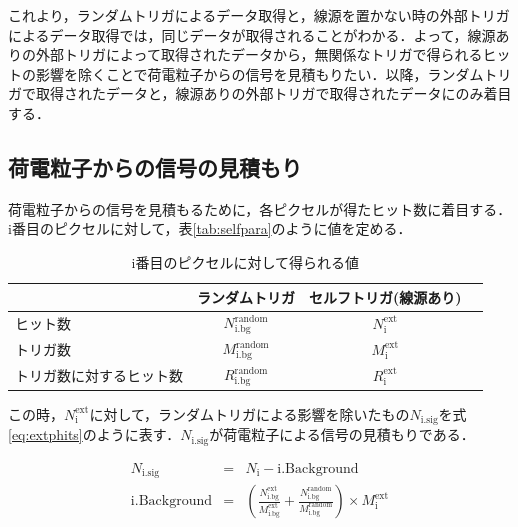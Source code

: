 これより，ランダムトリガによるデータ取得と，線源を置かない時の外部トリガによるデータ取得では，同じデータが取得されることがわかる．よって，線源ありの外部トリガによって取得されたデータから，無関係なトリガで得られるヒットの影響を除くことで荷電粒子からの信号を見積もりたい．以降，ランダムトリガで取得されたデータと，線源ありの外部トリガで取得されたデータにのみ着目する．

\subsection*{荷電粒子からの信号の見積もり}
荷電粒子からの信号を見積もるために，各ピクセルが得たヒット数に着目する．i番目のピクセルに対して，表\ref{tab:selfpara}のように値を定める．

\begin{table}[h]
  \centering
  \caption{i番目のピクセルに対して得られる値}
  \begin{tabular} {l|ccc} \hline
    & ランダムトリガ & セルフトリガ(線源あり) \\ \hline
    ヒット数 & $N_{\mathrm{i.bg}}^{\mathrm{random}}$ & $N_{\mathrm{i}}^{\mathrm{ext}}$ \\
    トリガ数 & $M_{\mathrm{i.bg}}^{\mathrm{random}}$ & $M_{\mathrm{i}}^{\mathrm{ext}}$ \\
    トリガ数に対するヒット数 & $R_{\mathrm{i.bg}}^{\mathrm{random}}$ & $R_{\mathrm{i}}^{\mathrm{ext}}$ \\\hline
  \end{tabular}
  \label{tab:extpara}
\end{table}

この時，$N_{\mathrm{i}}^{\mathrm{ext}}$に対して，ランダムトリガによる影響を除いたもの$N_{\mathrm{i.sig}}$を式\ref{eq:extphits}のように表す．$N_{\mathrm{i.sig}}$が荷電粒子による信号の見積もりである．
  
\begin{eqnarray}
  \label{eq:extphits}
  N_{\mathrm{i.sig}} &=& N_{\mathrm{i}} - \mathrm{i.Background} \\
  \mathrm{i.Background} &=& \left(\frac{N_{\mathrm{i.bg}}^{\mathrm{ext}}}{M_{\mathrm{i.bg}}^{\mathrm{ext}}} + \frac{N_{\mathrm{i.bg}}^{\mathrm{random}}}{M_{\mathrm{i.bg}}^{\mathrm{random}}} \right) \times M_{\mathrm{i}}^{\mathrm{ext}}
\end{eqnarray}

